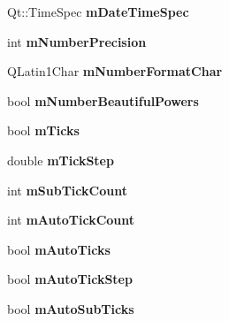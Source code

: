 \begin{DoxyCompactItemize}
\item 
\hypertarget{classQCPAxis_af73bec228c1a3203dc8aef1e84a46759}{\-Qt\-::\-Time\-Spec {\bfseries m\-Date\-Time\-Spec}}\label{classQCPAxis_af73bec228c1a3203dc8aef1e84a46759}

\item 
\hypertarget{classQCPAxis_acd76e8c783384d99ccc4a13797eec188}{int {\bfseries m\-Number\-Precision}}\label{classQCPAxis_acd76e8c783384d99ccc4a13797eec188}

\item 
\hypertarget{classQCPAxis_a39594313deef458f425bba25cd337a8a}{\-Q\-Latin1\-Char {\bfseries m\-Number\-Format\-Char}}\label{classQCPAxis_a39594313deef458f425bba25cd337a8a}

\item 
\hypertarget{classQCPAxis_af03809bee3f3e35fcc38d25b6dd5003b}{bool {\bfseries m\-Number\-Beautiful\-Powers}}\label{classQCPAxis_af03809bee3f3e35fcc38d25b6dd5003b}

\item 
\hypertarget{classQCPAxis_ab111e74bba22e06848897c932fc549fe}{bool {\bfseries m\-Ticks}}\label{classQCPAxis_ab111e74bba22e06848897c932fc549fe}

\item 
\hypertarget{classQCPAxis_a4fe96830fc5a2711e20fe5edccfe2ed3}{double {\bfseries m\-Tick\-Step}}\label{classQCPAxis_a4fe96830fc5a2711e20fe5edccfe2ed3}

\item 
\hypertarget{classQCPAxis_ad70198e6ae2801fc409bc3caec707da9}{int {\bfseries m\-Sub\-Tick\-Count}}\label{classQCPAxis_ad70198e6ae2801fc409bc3caec707da9}

\item 
\hypertarget{classQCPAxis_a499fbb67111e4b204738f6c1aa28d842}{int {\bfseries m\-Auto\-Tick\-Count}}\label{classQCPAxis_a499fbb67111e4b204738f6c1aa28d842}

\item 
\hypertarget{classQCPAxis_aac23adcbae246bf165d4539ad65ac9f9}{bool {\bfseries m\-Auto\-Ticks}}\label{classQCPAxis_aac23adcbae246bf165d4539ad65ac9f9}

\item 
\hypertarget{classQCPAxis_aada8934a5c44978653031782aa37d101}{bool {\bfseries m\-Auto\-Tick\-Step}}\label{classQCPAxis_aada8934a5c44978653031782aa37d101}

\item 
\hypertarget{classQCPAxis_aaae980b0d193d959674e314dbb6c2c3b}{bool {\bfseries m\-Auto\-Sub\-Ticks}}\label{classQCPAxis_aaae980b0d193d959674e314dbb6c2c3b}


\end{DoxyCompactItemize}
